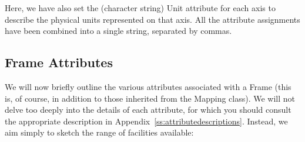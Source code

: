 \documentclass[twoside,11pt]{starlink}
\providecommand{\appref}[1]{Appendix~\ref{#1}}
\begin{document}
Here, we have also set the (character string) Unit attribute for each
axis to describe the physical units represented on that axis. All the
attribute assignments have been combined into a single string,
separated by commas.

\subsection{\label{ss:frameattributes}Frame Attributes}

We will now briefly outline the various attributes associated with a
Frame (this is, of course, in addition to those inherited from the
Mapping class). We will not delve too deeply into the details of each
attribute, for which you should consult the appropriate description in
\appref{ss:attributedescriptions}. Instead, we aim simply to sketch
the range of facilities available:
\end{document}
